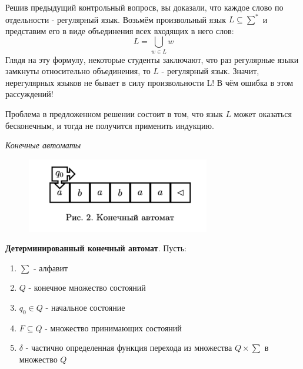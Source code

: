 \begin{question} Решив предыдущий контрольный вопросв, вы доказали, что каждое слово по отдельности - регулярный язык. Возьмём произвольный язык $L \subseteq \sum^{*}$ и представим его в виде объединения всех входящих в него слов:
    \begin{equation}
        L = \bigcup_{w \in L}{w}
    \end{equation}
    Глядя на эту формулу, некоторые студенты заключают, что раз регулярные языки замкнуты относительно объединения, то $L$ - регулярный язык. Значит, нерегулярных языков не бывает в силу произвольности L! В чём ошибка в этом рассуждений!
\end{question}
\begin{nonum}
    Проблема в предложенном решении состоит в том, что язык $L$ может оказаться бесконечным, и тогда не получится применить индукцию.
\end{nonum}

\begin{center}
    \textit{Конечные автоматы}
\end{center}

\begin{figure}[htp]
    \centering
    \includegraphics[width=8cm]{images/КонечныйАвтомат.PNG}
    \label{fig:stateMachine}
\end{figure}

\begin{Def}
    \textbf{Детерминированный конечный автомат}. Пусть:
    \begin{enumerate}
        \item $\sum$ - алфавит
        \item $Q$ - конечное множество состояний
        \item $q_0 \in Q$ - начальное состояние
        \item $F \subseteq Q$ - множество принимающих состояний
        \item $\delta$ - частично определенная функция перехода
              из множества $Q \times \sum$ в множество $Q$
    \end{enumerate}
\end{Def}
